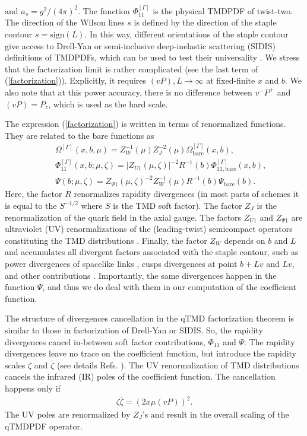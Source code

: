 \documentclass[aps,prl,twocolumn,secnumarabic,notitlepage,superscriptaddress,nofootinbib,tightenlines,floatfix,preprintnumbers]{revtex4-1}
\newcommand{\nn}{\nonumber}
\renewcommand{\(}{\left(}
\renewcommand{\)}{\right)}
\renewcommand{\[}{\left[}
\renewcommand{\]}{\right]}
\begin{document}
and $a_s=g^2/(4\pi)^2$. The function $\Phi_{11}^{[\Gamma]}$ is the physical TMDPDF of twist-two. The direction of the Wilson lines $s$ is defined by the direction of the staple contour $s=\text{sign}(L)$. In this way, different orientations of the staple contour give access to Drell-Yan or semi-inclusive deep-inelastic scattering (SIDIS) definitions of TMDPDFs, which can be used to test their universality \cite{Musch:2010ka, Musch:2011er}. We stress that the factorization limit is rather complicated (see the last term of (\ref{factorization})). Explicitly, it requires $(vP),L\to \infty$ at fixed-finite $x$ and $b$. We also note that at this power accuracy, there is no difference between $v^-P^+$ and $(vP)=P_z$, which is used as the hard scale. 

The expression (\ref{factorization}) is written in terms of renormalized functions. They are related to the bare functions as
\begin{eqnarray}\label{renormalization-factors}
&&\Omega^{[\Gamma]}(x,b,\mu)= Z_W^{-1}(\mu)Z_{J}^{-2}(\mu)\Omega^{[\Gamma]}_{\text{bare}}(x,b),
\\\nn
&&\Phi_{11}^{[\Gamma]}(x,b;\mu,\zeta)=|Z_{U1}(\mu,\zeta)|^{-2} R^{-1}(b)
\Phi_{11,\text{bare}}^{[\Gamma]}(x,b),
\\\nn
&&\Psi(b;\mu,\zeta)=Z_{\Psi1}(\mu,\zeta)^{-2}Z_W^{-1}(\mu) R^{-1}(b)
\Psi_{\text{bare}}(b).
\end{eqnarray}
Here, the factor $R$ renormalizes rapidity divergences (in most parts of schemes it is equal to the $S^{-1/2}$ where $S$ is the TMD soft factor). The factor $Z_J$ is the renormalization of the quark field in the axial gauge. The factors $Z_{U1}$ and $Z_{\Psi1}$ are ultraviolet (UV) renormalizations of the (leading-twist) semicompact operators constituting the TMD distributions \cite{Rodini:2022wki}. Finally, the factor $Z_W$ depends on $b$ and $L$ and accumulates all divergent factors associated with the staple contour, such as power divergences of spacelike links \cite{Dotsenko:1979wb}, cusps divergences at point $b+Lv$ and $Lv$, and other contributions \cite{Shanahan:2019zcq}. Importantly, the same divergences happen in the function $\Psi$, and thus we do deal with them in our computation of the coefficient function.

The structure of divergences cancellation in the qTMD factorization theorem is similar to those in factorization of Drell-Yan or SIDIS. So, the rapidity divergences cancel in-between soft factor contributions, $\Phi_{11}$ and $\Psi$. The rapidity divergences leave no trace on the coefficient function, but introduce the rapidity scales $\zeta$ and $\bar \zeta$ (see details Refs. \cite{Chiu:2012ir, Echevarria:2012js, Vladimirov:2020umg}). The UV renormalization of TMD distributions cancels the infrared (IR) poles of the coefficient function. The cancellation happens only if
\begin{eqnarray}\label{zeta*zeta}
\zeta \bar \zeta=(2 x \mu (vP))^2.
\end{eqnarray}
The UV poles are renormalized by $Z_J$'s and result in the overall scaling of the qTMDPDF operator.
\end{document}
